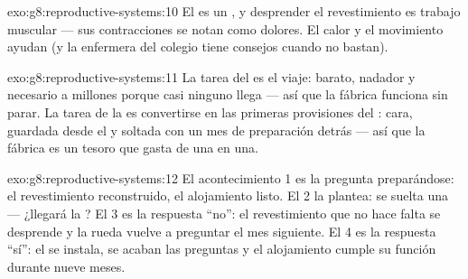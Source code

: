 \begin{solution}{exo:g8:reproductive-systems:10}
El  es un , y desprender el revestimiento es trabajo
muscular --- sus contracciones se notan como dolores. El calor y el
movimiento ayudan (y la enfermera del colegio tiene consejos cuando no
bastan).
\end{solution}

\begin{solution}{exo:g8:reproductive-systems:11}
La tarea del  es el viaje: barato, nadador y necesario a
millones porque casi ninguno llega --- así que la fábrica funciona sin
parar. La tarea de la   es convertirse en las primeras
provisiones del : cara, guardada desde el  y soltada
con un mes de preparación detrás --- así que la fábrica es un tesoro
que gasta de una en una.
\end{solution}

\begin{solution}{exo:g8:reproductive-systems:12}
El acontecimiento 1 es la pregunta preparándose: el revestimiento
reconstruido, el alojamiento listo. El 2 la plantea: se suelta una
  --- ¿llegará la ? El 3 es la respuesta
``no'': el revestimiento que no hace falta se desprende y la rueda
vuelve a preguntar el mes siguiente. El 4 es la respuesta ``sí'': el
 se instala, se acaban las preguntas y el alojamiento cumple su
función durante nueve meses.
\end{solution}

